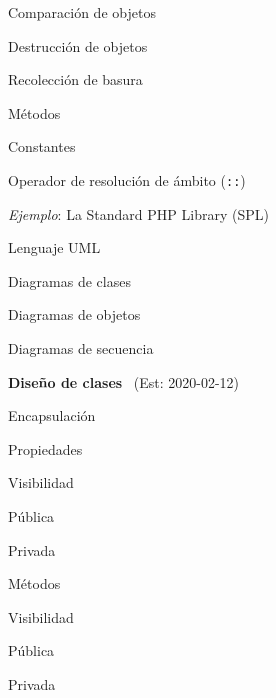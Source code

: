 \begin{longenum}
\begin{longenum}
\begin{longenum}
            \item Comparación de objetos
            \item Destrucción de objetos
            \begin{longenum}
                \item Recolección de basura
            \end{longenum}
            \item Métodos
            \item Constantes
            \begin{longenum}
                \item Operador de resolución de ámbito (\texttt{::})
            \end{longenum}
            \item \textit{Ejemplo}: La Standard PHP Library (SPL)
        \end{longenum}
        \item Lenguaje UML
        \begin{longenum}
            \item Diagramas de clases
            \item Diagramas de objetos
            \item Diagramas de secuencia
        \end{longenum}
    \end{longenum}
    \item \textbf{Diseño de clases} \ (Est: 2020-02-12)
    \begin{longenum}
        \item Encapsulación
        \item Propiedades
        \begin{longenum}
            \item Visibilidad
            \begin{longenum}
                \item Pública
                \item Privada
            \end{longenum}
        \end{longenum}
        \item Métodos
        \begin{longenum}
            \item Visibilidad
            \begin{longenum}
                \item Pública
                \item Privada
            \end{longenum}

\end{longenum}
\end{longenum}
\end{longenum}

